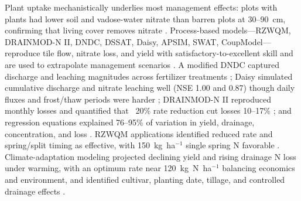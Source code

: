 Plant uptake mechanistically underlies most management effects: plots with plants had lower soil and vadose-water nitrate than barren plots at 30--90~cm, confirming that living cover removes nitrate \parencite{Bosompemaa2021}. Process-based models---RZWQM, DRAINMOD-N II, DNDC, DSSAT, Daisy, APSIM, SWAT, CoupModel---reproduce tile flow, nitrate loss, and yield with satisfactory-to-excellent skill and are used to extrapolate management scenarios \parencite{Jeong2018,Ahmed2007b,Ale2012b,Pasley2021,Motarjemi2021,Conrad2009}. A modified DNDC captured discharge and leaching magnitudes across fertilizer treatments \parencite{Li2006}; Daisy simulated cumulative discharge and nitrate leaching well (NSE 1.00 and 0.87) though daily fluxes and frost/thaw periods were harder \parencite{Motarjemi2021}; DRAINMOD-N II reproduced monthly losses and quantified that ~20\% rate reduction cut losses 10--17\% \parencite{Ale2012b}; and regression equations explained 76--95\% of variation in yield, drainage, concentration, and loss \parencite{Malone2007}. RZWQM applications identified reduced rate and spring/split timing as effective, with 150~kg~ha$^{-1}$ single spring N favorable \parencite{Azevedo1997,Malone2007b}. Climate-adaptation modeling projected declining yield and rising drainage N loss under warming, with an optimum rate near 120~kg~N~ha$^{-1}$ balancing economics and environment, and identified cultivar, planting date, tillage, and controlled drainage effects \parencite{Wang2016b}.

